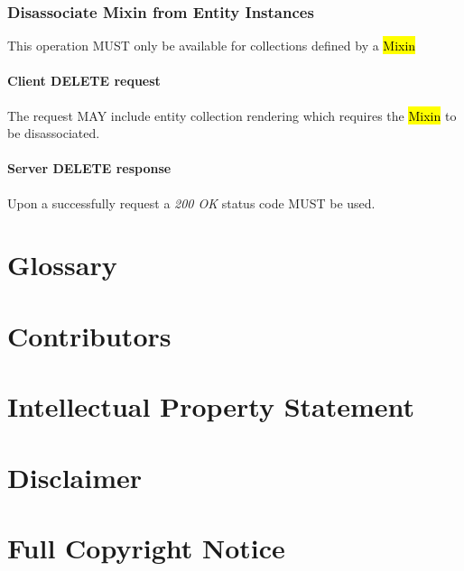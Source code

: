 \documentclass[10pt,a4paper]{article}
\begin{document}
\subsubsection{Disassociate Mixin from Entity Instances}
This operation MUST only be available for collections defined by a \hl{Mixin}

\paragraph{Client DELETE request}
The request MAY include entity collection rendering which requires the \hl{Mixin} to be disassociated.

\paragraph{Server DELETE response}
Upon a successfully request a \emph{200 OK} status code MUST be used.

\section{Glossary}
\label{sec:glossary}


\section{Contributors}


\section{Intellectual Property Statement}


\section{Disclaimer}


\section{Full Copyright Notice}




\end{document}

